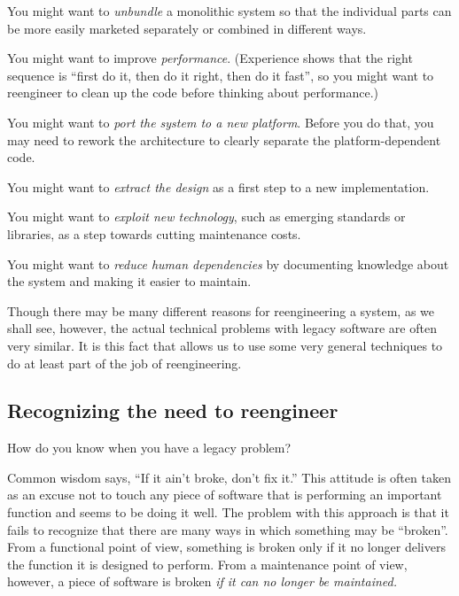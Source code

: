 \documentclass[a4paper,10pt,twoside]{book}
\begin{document}
\begin{bulletlist}
  \item You might want to \emph{unbundle} a monolithic system so that the individual parts can be more easily marketed separately or combined in different ways.

  \item You might want to improve \emph{performance}. (Experience shows that the right sequence is ``first do it, then do it right, then do it fast'', so you might want to reengineer to clean up the code before thinking about performance.)

  \item You might want to \emph{port the system to a new platform}. Before you do that, you may need to rework the architecture to clearly separate the platform-dependent code.

  \item You might want to \emph{extract the design} as a first step to a new implementation.

  \item You might want to \emph{exploit new technology}, such as emerging standards or libraries, as a step towards cutting maintenance costs.

  \item You might want to \emph{reduce human dependencies} by documenting knowledge about the system and making it easier to maintain.

\end{bulletlist}

Though there may be many different reasons for reengineering a system, as we shall see, however, the actual technical problems with legacy software are often very similar. It is this fact that allows us to use some very general techniques to do at least part of the job of reengineering.

\subsection*{Recognizing the need to reengineer}

How do you know when you have a legacy problem? 

Common wisdom says, ``If it ain't broke, don't fix it.'' This attitude is often taken as an excuse not to touch any piece of software that is performing an important function and seems to be doing it well. The problem with this approach is that it fails to recognize that there are many ways in which something may be ``broken''. From a functional point of view, something is broken only if it no longer delivers the function it is designed to perform. From a maintenance point of view, however, a piece of software is broken \emph{if it can no longer be maintained.}
\end{document}
